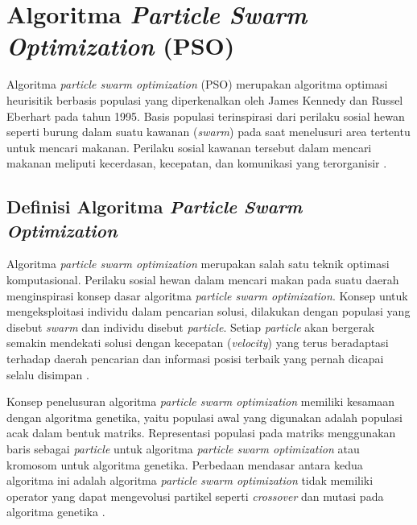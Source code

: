 \section{Algoritma \textit{Particle Swarm Optimization} (PSO)}
\vspace{-4mm}
{\frenchspacing
Algoritma \textit{particle swarm optimization} (PSO) merupakan algoritma optimasi heurisitik berbasis populasi yang diperkenalkan oleh James Kennedy dan Russel Eberhart pada tahun 1995.
Basis populasi terinspirasi dari perilaku sosial hewan seperti burung dalam suatu kawanan (\textit{swarm}) pada saat menelusuri area tertentu untuk mencari makanan.
Perilaku sosial kawanan tersebut dalam mencari makanan meliputi kecerdasan, kecepatan, dan komunikasi yang terorganisir .

\vspace{-5mm}
\subsection{Definisi Algoritma \textit{Particle Swarm Optimization}}
{\frenchspacing
    Algoritma \textit{particle swarm optimization} merupakan salah satu teknik optimasi komputasional.
    Perilaku sosial hewan dalam mencari makan pada suatu daerah menginspirasi konsep dasar algoritma \textit{particle swarm optimization}.
    Konsep untuk mengeksploitasi individu dalam pencarian solusi, dilakukan dengan populasi yang disebut \textit{swarm} dan individu disebut \textit{particle}.
    Setiap \textit{particle} akan bergerak semakin mendekati solusi dengan kecepatan (\textit{velocity}) yang terus beradaptasi terhadap daerah pencarian
    dan informasi posisi terbaik yang pernah dicapai selalu disimpan .

    Konsep penelusuran algoritma \textit{particle swarm optimization} memiliki kesamaan dengan algoritma genetika, yaitu populasi awal yang digunakan adalah populasi acak dalam bentuk matriks.
    Representasi populasi pada matriks menggunakan baris sebagai \textit{particle} untuk algoritma \textit{particle swarm optimization} atau kromosom untuk algoritma genetika.
    Perbedaan mendasar antara kedua algoritma ini adalah algoritma \textit{particle swarm optimization} tidak memiliki operator yang dapat mengevolusi partikel seperti \textit{crossover} dan mutasi pada algoritma genetika .

}}
